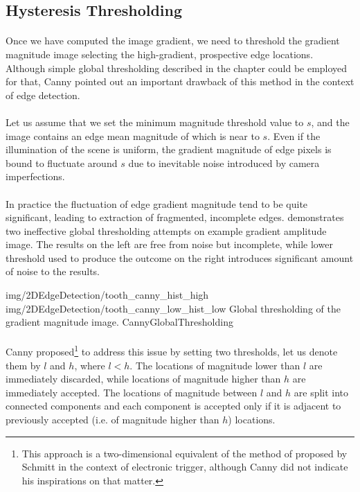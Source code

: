 \subsection{Hysteresis Thresholding}

\paragraph*{}
Once we have computed the image gradient, we need to threshold the gradient magnitude image selecting the high-gradient, prospective edge locations. Although simple global thresholding described in the  chapter could be employed for that, Canny pointed out an important drawback of this method in the context of edge detection.

\paragraph*{}
Let us assume that we set the minimum magnitude threshold value to $s$, and the image contains an edge mean magnitude of which is near to $s$. Even if the illumination of the scene is uniform, the gradient magnitude of edge pixels is bound to fluctuate around $s$ due to inevitable noise introduced by camera imperfections.

\paragraph*{}
In practice the fluctuation of edge gradient magnitude tend to be quite significant, leading to extraction of fragmented, incomplete edges.  demonstrates two ineffective global thresholding attempts on example gradient amplitude image. The results on the left are free from noise but incomplete, while lower threshold used to produce the outcome on the right introduces significant amount of noise to the results.

\twoFigures
{img/2DEdgeDetection/tooth_canny_hist_high}
{img/2DEdgeDetection/tooth_canny_low_hist_low}
{Global thresholding of the gradient magnitude image.}
{CannyGlobalThresholding}
{\basicWidth}

\paragraph*{}
Canny proposed\footnote{This approach is a two-dimensional equivalent of the method of proposed\cite{Schmitt38} by Schmitt in the context of electronic trigger, although Canny did not indicate his inspirations on that matter.} to address this issue by setting two thresholds, let us denote them by $l$ and $h$, where $l < h$. The locations of magnitude lower than $l$ are immediately discarded, while locations of magnitude higher than $h$ are immediately accepted. The locations of magnitude between $l$ and $h$ are split into connected components and each component is accepted only if it is adjacent to previously accepted (i.e. of magnitude higher than $h$) locations.


